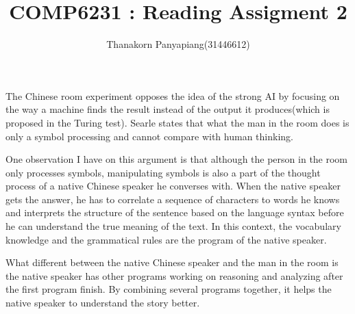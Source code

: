 \documentclass{article}
\title{COMP6231 : Reading Assigment 2}
\author{Thanakorn Panyapiang(31446612)}
\begin{document}
\maketitle

The Chinese room experiment opposes the idea of the strong AI by focusing on the way a machine finds the result instead of the output it produces(which is proposed in the Turing test).  Searle states that what the man in the room does is only a symbol processing and cannot compare with human thinking.

One observation I have on this argument is that although the person in the room only processes symbols, manipulating symbols is also a part of the thought process of a native Chinese speaker he converses with. When the native speaker gets the answer, he has to correlate a sequence of characters to words he knows and interprets the structure of the sentence based on the language syntax before he can understand the true meaning of the text. In this context, the vocabulary knowledge and the grammatical rules are the program of the native speaker. 

What different between the native Chinese speaker and the man in the room is the native speaker has other programs working on reasoning and analyzing after the first program finish. By combining several programs together, it helps the native speaker to understand the story better.
\end{document}

